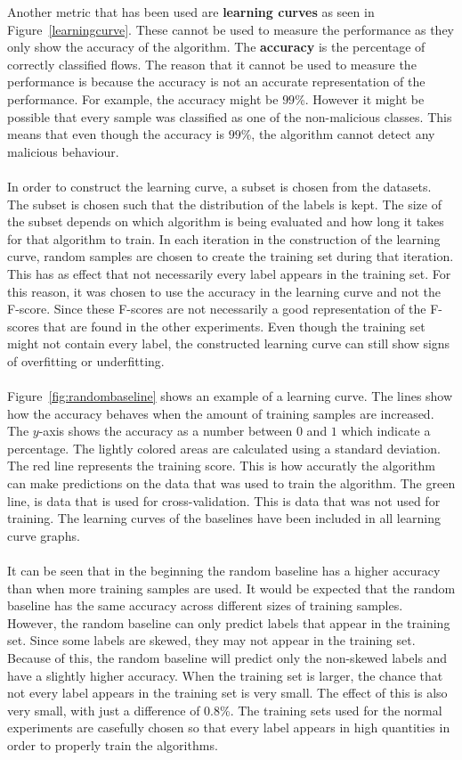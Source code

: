 Another metric that has been used are \textbf{learning curves} as seen in Figure~\ref{learningcurve}. These cannot be used to measure the performance as they only show the accuracy of the algorithm. The \textbf{accuracy} is the percentage of correctly classified flows. The reason that it cannot be used to measure the performance is because the accuracy is not an accurate representation of the performance. For example, the accuracy might be $99$\%. However it might be possible that every sample was classified as one of the non-malicious classes. This means that even though the accuracy is $99$\%, the algorithm cannot detect any malicious behaviour.\\
\\
In order to construct the learning curve, a subset is chosen from the datasets. The subset is chosen such that the distribution of the labels is kept. The size of the subset depends on which algorithm is being evaluated and how long it takes for that algorithm to train. In each iteration in the construction of the learning curve, random samples are chosen to create the training set during that iteration. This has as effect that not necessarily every label appears in the training set. For this reason, it was chosen to use the accuracy in the learning curve and not the F-score. Since these F-scores are not necessarily a good representation of the F-scores that are found in the other experiments. Even though the training set might not contain every label, the constructed learning curve can still show signs of overfitting or underfitting. \\
\\
Figure~\ref{fig:randombaseline} shows an example of a learning curve. The lines show how the accuracy behaves when the amount of training samples are increased. The $y$-axis shows the accuracy as a number between $0$ and $1$ which indicate a percentage. The lightly colored areas are calculated using a standard deviation. The red line represents the training score. This is how accuratly the algorithm can make predictions on the data that was used to train the algorithm. The green line, is data that is used for cross-validation. This is data that was not used for training. The learning curves of the baselines have been included in all learning curve graphs.\\
\\
It can be seen that in the beginning the random baseline has a higher accuracy than when more training samples are used. It would be expected that the random baseline  has the same accuracy across different sizes of training samples. However, the random baseline can only predict labels that appear in the training set. Since some labels are skewed, they may not appear in the training set. Because of this, the random baseline will predict only the non-skewed labels and have a slightly higher accuracy. When the training set is larger, the chance that not every label appears in the training set is very small. The effect of this is also very small, with just a difference of $0.8$\%. The training sets used for the normal experiments are casefully chosen so that every label appears in high quantities in order to properly train the algorithms. \\
